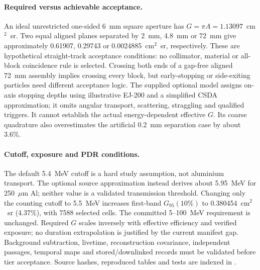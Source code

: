 \paragraph{Required versus achievable acceptance.}
An ideal unrestricted one-sided 6~mm square aperture has $G=\pi A=1.13097$~cm$^2$~sr. Two equal aligned planes separated by 2~mm, 4.8~mm or 72~mm give approximately 0.61907, 0.29743 or 0.0024885~cm$^2$~sr, respectively. These are hypothetical straight-track acceptance conditions: no collimator, material or all-block coincidence rule is selected. Crossing both ends of a gap-free aligned 72~mm assembly implies crossing every block, but early-stopping or side-exiting particles need different acceptance logic. The supplied optional model assigns on-axis stopping depths using illustrative EJ-200 and a simplified CSDA approximation; it omits angular transport, scattering, straggling and qualified triggers. It cannot establish the actual energy-dependent effective $G$. Its coarse quadrature also overestimates the artificial 0.2~mm separation case by about 3.6\%.

\paragraph{Cutoff, exposure and PDR conditions.}
The default 5.4~MeV cutoff is a hard study assumption, not aluminium transport. The optional source approximation instead derives about 5.95~MeV for 250~$\mu$m Al; neither value is a validated transmission threshold. Changing only the counting cutoff to 5.5~MeV increases first-band $G_{95}(10\%)$ to 0.380454~cm$^2$~sr (4.37\%), with 7588 selected cells. The committed 5--100~MeV requirement is unchanged. Required $G$ scales inversely with effective efficiency and verified exposure; no duration extrapolation is justified by the current manifest gap. Background subtraction, livetime, reconstruction covariance, independent passages, temporal maps and stored/downlinked records must be validated before tier acceptance. Source hashes, reproduced tables and tests are indexed in .

